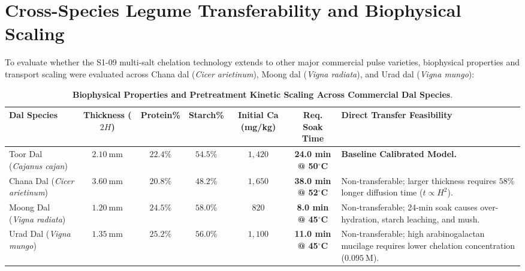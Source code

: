 \documentclass[10pt,a4paper]{article}
\begin{document}
\section{Cross-Species Legume Transferability and Biophysical Scaling}

To evaluate whether the S1-09 multi-salt chelation technology extends to other major commercial pulse varieties, biophysical properties and transport scaling were evaluated across Chana dal (\textit{Cicer arietinum}), Moong dal (\textit{Vigna radiata}), and Urad dal (\textit{Vigna mungo}):

\begin{table}[H]
\centering
\footnotesize
\setlength{\tabcolsep}{3.5pt}
\caption{\textbf{Biophysical Properties and Pretreatment Kinetic Scaling Across Commercial Dal Species}.}
\label{tab:cross_dal_scaling_exp}
\begin{tabularx}{\linewidth}{p{2.6cm}ccccc>{\raggedright\arraybackslash}X}
\toprule
\textbf{Dal Species} & \textbf{Thickness ($2H$)} & \textbf{Protein\%} & \textbf{Starch\%} & \textbf{Initial Ca (mg/kg)} & \textbf{Req. Soak Time} & \textbf{Direct Transfer Feasibility} \\
\midrule
Toor Dal (\textit{Cajanus cajan}) & $2.10\ \mathrm{mm}$ & $22.4\%$ & $54.5\%$ & $1,420$ & \textbf{24.0 min @ 50$^\circ$C} & \textbf{Baseline Calibrated Model.} \\
Chana Dal (\textit{Cicer arietinum}) & $3.60\ \mathrm{mm}$ & $20.8\%$ & $48.2\%$ & $1,650$ & \textbf{38.0 min @ 52$^\circ$C} & Non-transferable; larger thickness requires $58\%$ longer diffusion time ($t \propto H^2$). \\
Moong Dal (\textit{Vigna radiata}) & $1.20\ \mathrm{mm}$ & $24.5\%$ & $58.0\%$ & $820$ & \textbf{8.0 min @ 45$^\circ$C} & Non-transferable; 24-min soak causes over-hydration, starch leaching, and mush. \\
Urad Dal (\textit{Vigna mungo}) & $1.35\ \mathrm{mm}$ & $25.2\%$ & $56.0\%$ & $1,100$ & \textbf{11.0 min @ 45$^\circ$C} & Non-transferable; high arabinogalactan mucilage requires lower chelation concentration ($0.095\ \mathrm{M}$). \\
\bottomrule
\end{tabularx}
\end{table}
\end{document}
